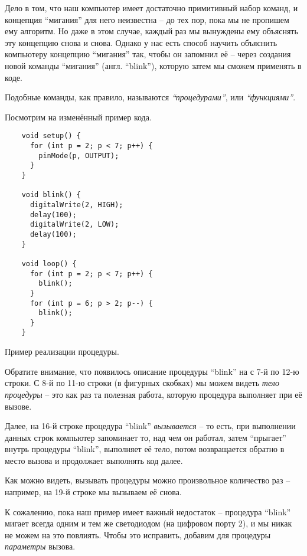 \documentclass[../sparc.tex]{subfiles}
\begin{document}
Дело в том, что наш компьютер имеет достаточно примитивный набор команд, и
концепция ``мигания'' для него неизвестна -- до тех пор, пока мы не пропишем ему
алгоритм.  Но даже в этом случае, каждый раз мы вынуждены ему объяснять эту
концепцию снова и снова.  Однако у нас есть способ научить объяснить компьютеру
концепцию ``мигания'' так, чтобы он запомнил её -- через создания новой команды
``мигания'' (англ. ``blink''), которую затем мы сможем применять в коде.

Подобные команды, как правило, называются \emph{``процедурами''}, или
\emph{``функциями''}.

Посмотрим на изменённый пример кода.

\begin{listing}[H]
  \begin{verbatim}
    void setup() {
      for (int p = 2; p < 7; p++) {
        pinMode(p, OUTPUT);
      }
    }

    void blink() {
      digitalWrite(2, HIGH);
      delay(100);
      digitalWrite(2, LOW);
      delay(100);
    }

    void loop() {
      for (int p = 2; p < 7; p++) {
        blink();
      }
      for (int p = 6; p > 2; p--) {
        blink();
      }
    }
  \end{verbatim}
  \label{listing:procedure-example-1}
  \caption{Пример реализации процедуры.}
\end{listing}

Обратите внимание, что появилось описание процедуры ``blink'' на с 7-й по 12-ю
строки.  С 8-й по 11-ю строки (в фигурных скобках) мы можем видеть \emph{тело
процедуры} -- это как раз та полезная работа, которую процедура выполняет при её
вызове.

Далее, на 16-й строке процедура ``blink'' \emph{вызывается} -- то есть, при
выполнении данных строк компьютер запоминает то, над чем он работал, затем
``прыгает'' внутрь процедуры ``blink'', выполняет её тело, потом возвращается
обратно в место вызова и продолжает выполнять код далее.

Как можно видеть, вызывать процедуры можно произвольное количество раз --
например, на 19-й строке мы вызываем её снова.

К сожалению, пока наш пример имеет важный недостаток -- процедура ``blink''
мигает всегда одним и тем же светодиодом (на цифровом порту 2), и мы никак не
можем на это повлиять.  Чтобы это исправить, добавим для процедуры
\emph{параметры} вызова.
\end{document}
